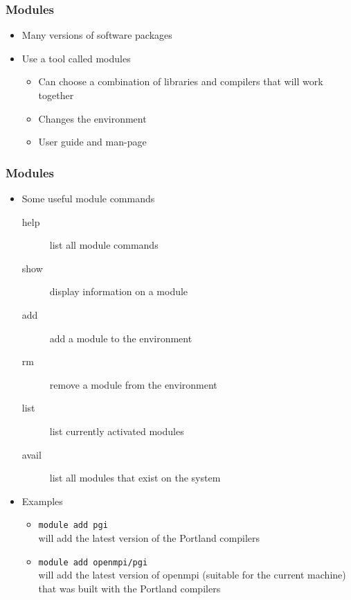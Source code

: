 \begin{frame}
	\frametitle{Modules}

	\begin{itemize}
		\item	Many versions of software packages
		\item	Use a tool called modules
			\begin{itemize}
				\item	Can choose a combination of libraries and compilers
						that will work together
				\item	Changes the environment
				\item	User guide and man-page
			\end{itemize}
	\end{itemize}

\end{frame}
\begin{frame}
	\frametitle{Modules}

	\begin{itemize}
		\item	Some useful module commands
			\begin{description}
				\item[help]		list all module commands
				\item[show]		display information on a module
				\item[add]		add a module to the environment
				\item[rm]		remove a module from the environment
				\item[list]		list currently activated modules
				\item[avail]	list all modules that exist on the system
			\end{description}
		\item	Examples
			\begin{itemize}
				\item	\texttt{module add pgi}\\
						will add the latest version of the Portland compilers
				\item	\texttt{module add openmpi/pgi}\\
						will add the latest version of openmpi
						(suitable for the current machine)
						that was built with the Portland compilers
			\end{itemize}
	\end{itemize}

\end{frame}


